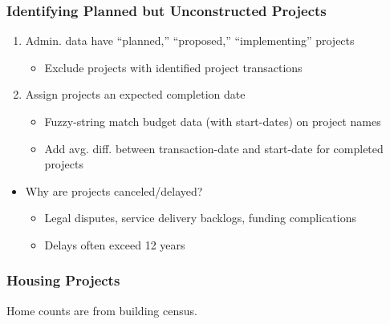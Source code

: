 \documentclass[aspectratio=149]{beamer}
\begin{document}
\begin{frame}
\begin{tikzpicture}[overlay]
\end{tikzpicture}

\end{frame}







\begin{frame}
\frametitle{Identifying Planned but Unconstructed Projects}

\begin{enumerate}
  \item Admin. data have ``planned,'' ``proposed,'' ``implementing'' projects
    \begin{itemize}
      \item Exclude projects with identified project transactions
    \end{itemize}

    \vspace{.2cm}

  \item Assign projects an expected completion date
    \begin{itemize}
      \item Fuzzy-string match budget data (with start-dates) on project names
      \item Add avg. diff. between transaction-date and start-date for completed projects
    \end{itemize}
\end{enumerate}

\begin{itemize}
  \item Why are projects canceled/delayed? 
    \begin{itemize}
      \item Legal disputes, service delivery backlogs, funding complications
      \item Delays often exceed 12 years 
    \end{itemize} 
\end{itemize}
\end{frame}


\begin{frame}
\frametitle{Housing Projects}
\begin{center}

\end{center}
Home counts are from building census.
\end{frame}
\end{document}
